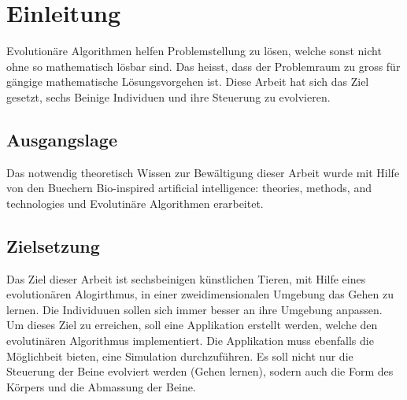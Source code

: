 %
%


\chapter{Einleitung}

Evolutionäre Algorithmen helfen Problemstellung zu lösen, welche sonst nicht ohne so mathematisch lösbar sind.
Das heisst, dass der Problemraum zu gross für gängige mathematische Lösungsvorgehen ist.
Diese Arbeit hat sich das Ziel gesetzt, sechs Beinige Individuen und ihre Steuerung zu evolvieren.

\section{Ausgangslage}

Das notwendig theoretisch Wissen zur Bewältigung dieser Arbeit wurde mit Hilfe von den Buechern
Bio-inspired artificial intelligence: theories, methods, and technologies \cite[]{book:bioInspired} und
Evolutinäre Algorithmen \cite[]{book:evAlgo} erarbeitet.

\section{Zielsetzung}
  Das Ziel dieser Arbeit ist sechsbeinigen künstlichen Tieren, mit Hilfe eines evolutionären Alogirthmus, in einer zweidimensionalen Umgebung das Gehen zu lernen.
  Die Individuuen sollen sich immer besser an ihre Umgebung anpassen.
  Um dieses Ziel zu erreichen, soll eine Applikation erstellt werden, welche den evolutinären Algorithmus implementiert.
  Die Applikation muss ebenfalls die Möglichbeit bieten, eine Simulation durchzuführen.
  Es soll nicht nur die Steuerung der Beine evolviert werden (Gehen lernen), sodern auch die Form des Körpers und die Abmassung der Beine.

